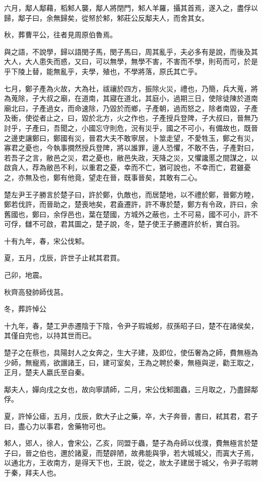 \begin{pinyinscope}
六月，鄅人鄅藉，稻邾人襲，鄅人將閉門，邾人羊羅，攝其首焉，遂入之，盡俘以歸，鄅子曰，余無歸矣，從帑於邾，邾莊公反鄅夫人，而舍其女。

秋，葬曹平公，往者見周原伯魯焉。

與之語，不說學，歸以語閔子馬，閔子馬曰，周其亂乎，夫必多有是說，而後及其大人，大人患失而惑，又曰，可以無學，無學不害，不害而不學，則苟而可，於是乎下陵上替，能無亂乎，夫學，殖也，不學將落，原氏其亡乎。

七月，鄭子產為火故，大為社，祓禳於四方，振除火災，禮也，乃簡，兵大蒐，將為蒐除，子大叔之廟，在道南，其寢在道北，其庭小，過期三日，使除徒陳於道南廟北曰，子產過女，而命速除，乃毀於而鄉，子產朝，過而怒之，除者南毀，子產及衝，使從者止之，曰，毀於北方，火之作也，子產授兵登陴，子大叔曰，晉無乃討乎，子產曰，吾聞之，小國忘守則危，況有災乎，國之不可小，有備故也，既晉之邊吏讓鄭曰，鄭國有災，晉君大夫不敢寧居，卜筮走望，不愛牲玉，鄭之有災，寡君之憂也，今執事撊然授兵登陴，將以誰罪，邊人恐懼，不敢不告，子產對曰，若吾子之言，敝邑之災，君之憂也，敝邑失政，天降之災，又懼讒慝之間謀之，以啟貪人，荐為敝邑不利，以重君之憂，幸而不亡，猶可說也，不幸而亡，君雖憂之，亦無及也，鄭有他竟，望走在晉，既事晉矣，其敢有二心。

楚左尹王子勝言於楚子曰，許於鄭，仇敵也，而居楚地，以不禮於鄭，晉鄭方睦，鄭若伐許，而晉助之，楚喪地矣，君盍遷許，許不專於楚，鄭方有令政，許曰，余舊國也，鄭曰，余俘邑也，葉在楚國，方城外之蔽也，土不可易，國不可小，許不可俘，讎不可啟，君其圖之，楚子說，冬，楚子使王子勝遷許於析，實白羽。

十有九年，春，宋公伐邾。

夏，五月，戊辰，許世子止弒其君買。

己卯，地震。

秋齊高發帥師伐莒。

冬，葬許悼公

十九年，春，楚工尹赤遷陰于下陰，令尹子瑕城郟，叔孫昭子曰，楚不在諸侯矣，其僅自完也，以持其世而已。

楚子之在蔡也，具陽封人之女奔之，生大子建，及即位，使伍奢為之師，費無極為少師，無寵焉，欲譖諸王，曰，建可室矣，王為之聘於秦，無極與逆，勸王取之，正月，楚夫人嬴氏至自秦。

鄅夫人，嬋向戌之女也，故向寧請師，二月，宋公伐邾圍蟲，三月取之，乃盡歸鄅俘。

夏，許悼公瘧，五月，戊辰，飲大子止之藥，卒，大子奔晉，書曰，弒其君，君子曰，盡心力以事君，舍藥物可也。

邾人，郳人，徐人，會宋公，乙亥，同盟于蟲，楚子為舟師以伐濮，費無極言於楚子曰，晉之伯也，邇於諸夏，而楚辟陋，故弗能與爭，若大城城父，而寘大子焉，以通北方，王收南方，是得天下也，王說，從之，故太子建居于城父，令尹子瑕聘于秦，拜夫人也。


\end{pinyinscope}
